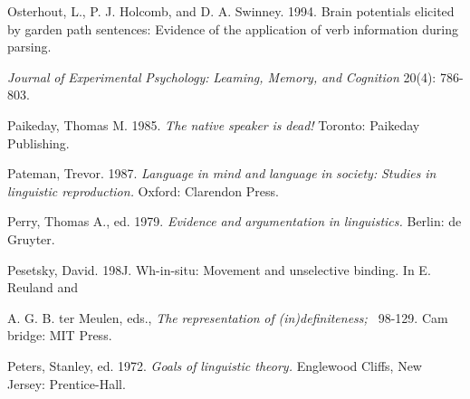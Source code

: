 \begin{styleStandard}
Osterhout, L., P. J. Holcomb, and D. A. Swinney. 1994. Brain potentials elicited by garden\- path sentences: Evidence of the application of verb information during parsing.
\end{styleStandard}


\begin{styleStandard}
\textit{Journal}\textit{ }\textit{of}\textit{ }\textit{Experimental}\textit{ }\textit{Psychology:}\textit{ }\textit{Leaming, Memory,}\textit{ }\textit{and}\textit{ }\textit{Cognition}\textit{ }20(4): 786-803.
\end{styleStandard}


\begin{styleStandard}
Paikeday, Thomas M. 1985. \textit{The}\textit{ }\textit{native}\textit{ }\textit{speaker}\textit{ }\textit{is}\textit{ }\textit{dead!}\textit{ }Toronto: Paikeday Publishing.
\end{styleStandard}


\begin{styleStandard}
Pateman, Trevor. 1987. \textit{Language}\textit{ }\textit{in}\textit{ }\textit{mind}\textit{ }\textit{and}\textit{ }\textit{language}\textit{ }\textit{in}\textit{ }\textit{society:}\textit{ }\textit{Studies}\textit{ }\textit{in}\textit{ }\textit{linguistic reproduction.}\textit{ }Oxford: Clarendon Press.
\end{styleStandard}


\begin{styleStandard}
Perry, Thomas A., ed. 1979. \textit{Evidence}\textit{ }\textit{and}\textit{ }\textit{argumentation}\textit{ }\textit{in}\textit{ }\textit{linguistics.}\textit{ }Berlin: de Gruyter.
\end{styleStandard}


\begin{styleStandard}
Pesetsky, David. 198J. Wh-in-situ: Movement and unselective binding. In E. Reuland and
\end{styleStandard}


\begin{styleStandard}
A. G. B. ter Meulen, eds., \textit{The}\textit{ }\textit{representation}\textit{ }\textit{of}\textit{ }\textit{(in)definiteness; }\textit{\ }98-129. Cam\- bridge: MIT Press.
\end{styleStandard}


\begin{styleStandard}
Peters, Stanley, ed. 1972. \textit{Goals}\textit{ }\textit{of}\textit{ }\textit{linguistic theory.}\textit{ }Englewood Cliffs, New Jersey: Prentice-Hall.
\end{styleStandard}


